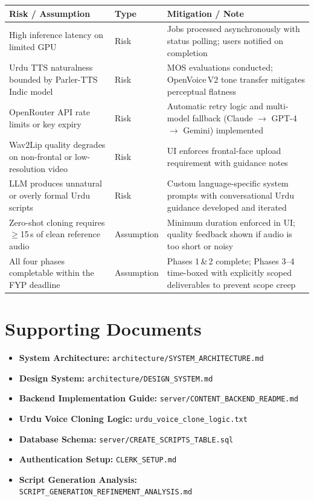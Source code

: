 ﻿\documentclass[12pt, a4paper]{article}
\newcommand{\thead}[1]{\cellcolor{headerbg}\textcolor{headertext}{\textbf{#1}}}
\newcommand{\talt}{\rowcolor{rowalt}}
\begin{document}
\begin{tabular}{>{\raggedright\arraybackslash}p{4.8cm}
                >{\centering\arraybackslash}p{2.0cm}
                >{\raggedright\arraybackslash}p{6.8cm}}
  \toprule
  \thead{Risk / Assumption} & \thead{Type} & \thead{Mitigation / Note} \\
  \midrule
  High inference latency on limited GPU
    & Risk
    & Jobs processed asynchronously with status polling; users notified on completion \\
  \talt
  Urdu TTS naturalness bounded by Parler-TTS Indic model
    & Risk
    & MOS evaluations conducted; OpenVoice\,V2 tone transfer mitigates
      perceptual flatness \\
  OpenRouter API rate limits or key expiry
    & Risk
    & Automatic retry logic and multi-model fallback (Claude $\to$ GPT-4 $\to$
      Gemini) implemented \\
  \talt
  Wav2Lip quality degrades on non-frontal or low-resolution video
    & Risk
    & UI enforces frontal-face upload requirement with guidance notes \\
  LLM produces unnatural or overly formal Urdu scripts
    & Risk
    & Custom language-specific system prompts with conversational Urdu guidance
      developed and iterated \\
  \talt
  Zero-shot cloning requires $\geq$15\,s of clean reference audio
    & Assumption
    & Minimum duration enforced in UI; quality feedback shown if audio is too
      short or noisy \\
  All four phases completable within the FYP deadline
    & Assumption
    & Phases 1\,\&\,2 complete; Phases 3--4 time-boxed with explicitly scoped
      deliverables to prevent scope creep \\
  \bottomrule
\end{tabular}

\section{Supporting Documents}

\begin{itemize}[leftmargin=1.4em, itemsep=3pt]
  \item \textbf{System Architecture:}
        \texttt{architecture/SYSTEM\_ARCHITECTURE.md}
  \item \textbf{Design System:}
        \texttt{architecture/DESIGN\_SYSTEM.md}
  \item \textbf{Backend Implementation Guide:}
        \texttt{server/CONTENT\_BACKEND\_README.md}
  \item \textbf{Urdu Voice Cloning Logic:}
        \texttt{urdu\_voice\_clone\_logic.txt}
  \item \textbf{Database Schema:}
        \texttt{server/CREATE\_SCRIPTS\_TABLE.sql}
  \item \textbf{Authentication Setup:}
        \texttt{CLERK\_SETUP.md}
  \item \textbf{Script Generation Analysis:}
        \texttt{SCRIPT\_GENERATION\_REFINEMENT\_ANALYSIS.md}
\end{itemize}
\end{document}
